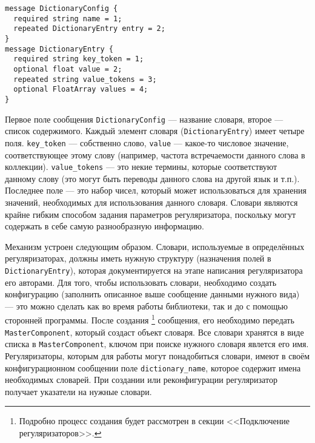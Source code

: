 \vspace{4pt}
\noindent
\verb|message DictionaryConfig {| \\
\verb|  required string name = 1;| \\
\verb|  repeated DictionaryEntry entry = 2;| \\
\verb|}| \\
\noindent
\verb|message DictionaryEntry {| \\
\verb|  required string key_token = 1;| \\
\verb|  optional float value = 2;| \\
\verb|  repeated string value_tokens = 3;| \\
\verb|  optional FloatArray values = 4;| \\
\verb|}|

\vspace{4pt}

Первое поле сообщения \verb|DictionaryConfig| --- название словаря, второе --- список содержимого. Каждый элемент словаря (\verb|DictionaryEntry|) имеет четыре поля. \verb|key_token| --- собственно слово, \verb|value| --- какое-то числовое значение, соответствующее этому слову (например, частота встречаемости данного слова в коллекции). \verb|value_tokens| --- это некие термины, которые соответствуют данному слову (это могут быть переводы данного слова на другой язык и т.п.). Последнее поле --- это набор чисел, который может использоваться для хранения значений, необходимых для использования данного словаря. Словари являются крайне гибким способом задания параметров регуляризатора, поскольку могут содержать в себе самую разнообразную информацию. 

Механизм устроен следующим образом. Словари, используемые в определённых регуляризаторах, должны иметь нужную структуру (назначения полей в \verb|DictionaryEntry|), которая документируется на этапе написания регуляризатора его авторами. Для того, чтобы использовать словари, необходимо создать конфигурацию (заполнить описанное выше сообщение данными нужного вида) --- 
это можно сделать как во время работы библиотеки, так и до с помощью сторонней программы. После создания
 \footnote{Подробно процесс создания будет рассмотрен в секции <<Подключение регуляризаторов>>.}
 сообщения, его необходимо передать \verb|MasterComponent|, который создаст объект словаря. Все словари хранятся в виде списка в \verb|MasterComponent|, ключом при поиске нужного словаря явлется его имя.
Регуляризаторы, которым для работы могут понадобиться словари, имеют в своём конфигурационном сообщении поле \verb|dictionary_name|, которое содержит имена необходимых словарей. При создании или реконфигурации регуляризатор получает указатели на нужные словари.

